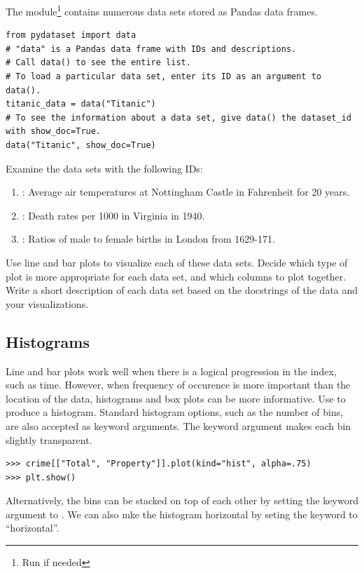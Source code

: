 \begin{problem}
The  module\footnote{Run  if needed} contains numerous data sets stored as Pandas data frames.
\begin{lstlisting}
from pydataset import data
# "data" is a Pandas data frame with IDs and descriptions.
# Call data() to see the entire list.
# To load a particular data set, enter its ID as an argument to data().
titanic_data = data("Titanic")
# To see the information about a data set, give data() the dataset_id with show_doc=True.
data("Titanic", show_doc=True)
\end{lstlisting}
Examine the data sets with the following  IDs:
\begin{enumerate}
\item {}: Average air temperatures at Nottingham Castle in Fahrenheit for 20 years.
\item {}: Death rates per 1000 in Virginia in 1940.
\item {}: Ratios of male to female births in London from 1629-171.
\end{enumerate}
Use line and bar plots to visualize each of these data sets.
Decide which type of plot is more appropriate for each data set, and which columns to plot together.
Write a short description of each data set based on the docstrings of the data and your visualizations.
\end{problem}

\subsection*{Histograms}

Line and bar plots work well when there is a logical progression in the index, such as time.
However, when frequency of occurence is more important than the location of the data, histograms and box plots can be more informative.
Use  to produce a histogram.
Standard histogram options, such as the number of bins, are also accepted as keyword arguments.
The  keyword argument makes each bin slightly transparent.

\begin{lstlisting}
>>> crime[["Total", "Property"]].plot(kind="hist", alpha=.75)
>>> plt.show()
\end{lstlisting}

Alternatively, the bins can be stacked on top of each other by setting the  keyword argument to .
We can also mke the histogram horizontal by seting the keyword   to ``horizontal''.

